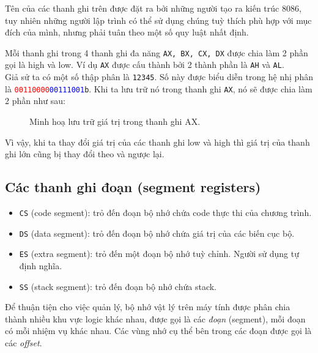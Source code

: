 \documentclass[12pt]{report}
\newcommand{\code}[1]{\texttt{#1}}
\begin{document}
Tên của các thanh ghi trên được đặt ra bởi những người tạo ra kiến trúc 8086, tuy nhiên những người lập trình có thể sử dụng chúng tuỳ thích phù hợp với mục đích của mình, nhưng phải tuân theo một số quy luật nhất định.\bigskip

Mỗi thanh ghi trong 4 thanh ghi đa năng \code{AX, BX, CX, DX} được chia làm 2 phần gọi là high và low. Ví dụ \code{AX} được cấu thành bởi 2 thành phần là \code{AH} và \code{AL}.\\
Giả sử ta có một số thập phân là \code{12345}. Số này được biểu diễn trong hệ nhị phân là \textcolor{red}{\code{00110000}}\textcolor{blue}{\code{00111001}}\code{b}. Khi ta lưu trữ nó trong thanh ghi \code{AX}, nó sẽ được chia làm 2 phần như sau:

\begin{figure}[H]
    \centering
    \caption{Minh hoạ lưu trữ giá trị trong thanh ghi AX.}
\end{figure}

Vì vậy, khi ta thay đổi giá trị của các thanh ghi low và high thì giá trị của thanh ghi lớn cũng bị thay đổi theo và ngược lại.

\subsection{Các thanh ghi đoạn (segment registers)}
\begin{itemize}
    \item \code{CS} (code segment): trỏ đến đoạn bộ nhớ chứa code thực thi của chương trình.
    \item \code{DS} (data segment): trỏ đến đoạn bộ nhớ chứa giá trị của các biến cục bộ.
    \item \code{ES} (extra segment): trỏ đến một đoạn bộ nhớ tuỳ chỉnh. Người sử dụng tự định nghĩa.
    \item \code{SS} (stack segment): trỏ đến đoạn bộ nhớ chứa stack.
\end{itemize}

Để thuận tiện cho việc quản lý, bộ nhớ vật lý trên máy tính được phân chia thành nhiều khu vực logic khác nhau, được gọi là các \textit{đoạn} (segment), mỗi đoạn có mỗi nhiệm vụ khác nhau. Các vùng nhớ cụ thể bên trong các đoạn được gọi là các \textit{offset}.
\end{document}
